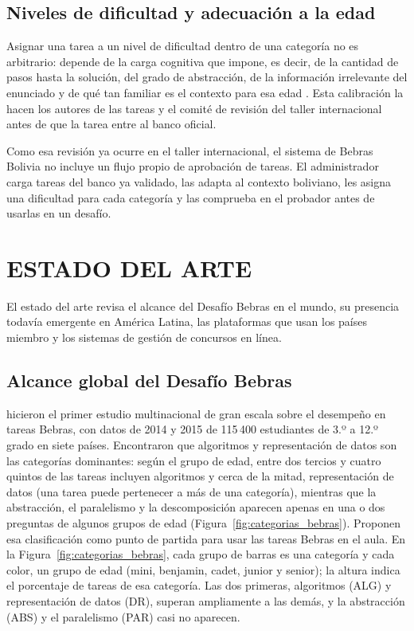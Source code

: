 \subsection{Niveles de dificultad y adecuación a la edad}

Asignar una tarea a un nivel de dificultad dentro de una categoría no es arbitrario: depende de la carga cognitiva que impone, es decir, de la cantidad de pasos hasta la solución, del grado de abstracción, de la información irrelevante del enunciado y de qué tan familiar es el contexto para esa edad \parencite{dagienestupuriene2016}. Esta calibración la hacen los autores de las tareas y el comité de revisión del taller internacional antes de que la tarea entre al banco oficial.

Como esa revisión ya ocurre en el taller internacional, el sistema de Bebras Bolivia no incluye un flujo propio de aprobación de tareas. El administrador carga tareas del banco ya validado, las adapta al contexto boliviano, les asigna una dificultad para cada categoría y las comprueba en el probador antes de usarlas en un desafío.

\section{ESTADO DEL ARTE}

El estado del arte revisa el alcance del Desafío Bebras en el mundo, su presencia todavía emergente en América Latina, las plataformas que usan los países miembro y los sistemas de gestión de concursos en línea.

\subsection{Alcance global del Desafío Bebras}

\textcite{izumirolo2017} hicieron el primer estudio multinacional de gran escala sobre el desempeño en tareas Bebras, con datos de 2014 y 2015 de 115\,400 estudiantes de 3.º a 12.º grado en siete países. Encontraron que algoritmos y representación de datos son las categorías dominantes: según el grupo de edad, entre dos tercios y cuatro quintos de las tareas incluyen algoritmos y cerca de la mitad, representación de datos (una tarea puede pertenecer a más de una categoría), mientras que la abstracción, el paralelismo y la descomposición aparecen apenas en una o dos preguntas de algunos grupos de edad (Figura~\ref{fig:categorias_bebras}). Proponen esa clasificación como punto de partida para usar las tareas Bebras en el aula. En la Figura~\ref{fig:categorias_bebras}, cada grupo de barras es una categoría y cada color, un grupo de edad (mini, benjamin, cadet, junior y senior); la altura indica el porcentaje de tareas de esa categoría. Las dos primeras, algoritmos (ALG) y representación de datos (DR), superan ampliamente a las demás, y la abstracción (ABS) y el paralelismo (PAR) casi no aparecen.

